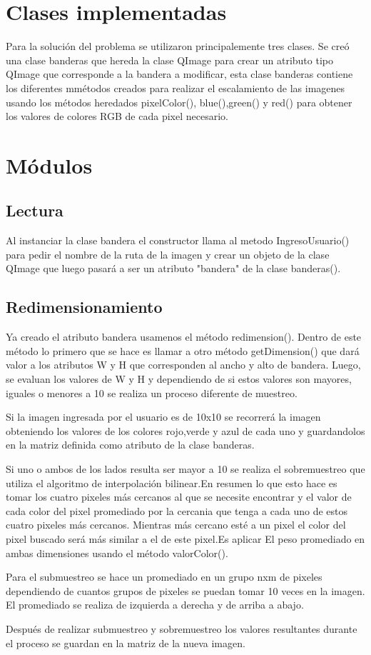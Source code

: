 \documentclass{article}
\begin{document}
\section{Clases implementadas}
Para la solución del problema se utilizaron principalemente tres clases. Se creó una clase banderas que hereda la clase QImage para crear un atributo tipo QImage que corresponde a la bandera a modificar, esta clase banderas contiene los diferentes mmétodos creados para realizar el escalamiento de las imagenes usando los métodos heredados pixelColor(), blue(),green() y red() para obtener los valores de colores RGB de cada pixel necesario.

\section{Módulos}

    \subsection{Lectura} Al instanciar la clase bandera el constructor llama al metodo IngresoUsuario() para pedir el nombre de la ruta de la imagen y crear un objeto de la clase QImage que luego pasará a ser un atributo "bandera" de la clase banderas().
    \subsection{Redimensionamiento}Ya creado el atributo bandera usamenos el método redimension(). Dentro de este método lo primero que se hace es llamar a otro método getDimension() que dará valor a los atributos W y H que corresponden al ancho y alto de bandera. Luego, se evaluan los valores de W y H y dependiendo de si estos valores son mayores, iguales o menores a 10 se realiza un proceso diferente de muestreo.
    
    \begin{description}
        \item Si la imagen ingresada por el usuario es de 10x10 se recorrerá la imagen obteniendo los valores de los colores rojo,verde y azul de cada uno y guardandolos en la matriz definida como atributo de la clase banderas.
        \item[Sobremuestreo] Si uno o ambos de los lados resulta ser mayor a 10 se realiza el sobremuestreo que utiliza el algoritmo de interpolación bilinear.En resumen lo que esto hace es tomar los cuatro pixeles más cercanos al que se necesite encontrar y el valor de cada color del pixel promediado por la cercania que tenga a cada uno de estos cuatro pixeles más cercanos. Mientras más cercano esté a un pixel el color del pixel buscado será más similar a el de este pixel.Es aplicar El peso promediado en ambas dimensiones usando el método valorColor().
        \item[Submuestreo] Para el submuestreo se hace un promediado en un grupo nxm de pixeles dependiendo de cuantos grupos de pixeles se puedan tomar 10 veces en la imagen. El promediado se realiza de izquierda a derecha y de arriba a abajo.
    \end{description}
    Después de realizar submuestreo y sobremuestreo los valores resultantes durante el proceso se guardan en la matriz de la nueva imagen.
\end{document}

